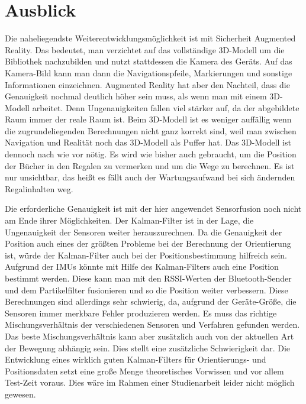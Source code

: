 \chapter{Ausblick}
  \label{Ausblick}
Die naheliegendste Weiterentwicklungsmöglichkeit ist mit Sicherheit Augmented Reality. Das bedeutet, man verzichtet auf das vollständige 3D-Modell um die Bibliothek nachzubilden und nutzt stattdessen die Kamera des Geräts. Auf das Kamera-Bild kann man dann die Navigationspfeile, Markierungen und sonstige Informationen einzeichnen. Augmented Reality hat aber den Nachteil, dass die Genauigkeit nochmal deutlich höher sein muss, als wenn man mit einem 3D-Modell arbeitet. Denn Ungenauigkeiten fallen viel stärker auf, da der abgebildete Raum immer der reale Raum ist. Beim 3D-Modell ist es weniger auffällig wenn die zugrundeliegenden Berechnungen nicht ganz korrekt sind, weil man zwischen Navigation und Realität noch das 3D-Modell als Puffer hat. Das 3D-Modell ist dennoch nach wie vor nötig. Es wird wie bisher auch gebraucht, um die Position der Bücher in den Regalen zu vermerken und um die Wege zu berechnen. Es ist nur unsichtbar, das heißt es fällt auch der Wartungsaufwand bei sich ändernden Regalinhalten weg.

Die erforderliche Genauigkeit ist mit der hier angewendet Sensorfusion noch nicht am Ende ihrer Möglichkeiten. Der Kalman-Filter ist in der Lage, die Ungenauigkeit der Sensoren weiter herauszurechnen. Da die Genauigkeit der Position auch eines der größten Probleme bei der Berechnung der Orientierung ist, würde der Kalman-Filter auch bei der Positionsbestimmung hilfreich sein. Aufgrund der IMUs könnte mit Hilfe des Kalman-Filters auch eine Position bestimmt werden. Diese kann man mit den RSSI-Werten der Bluetooth-Sender und dem Partikelfilter fusionieren und so die Position weiter verbessern. Diese Berechnungen sind allerdings sehr schwierig, da, aufgrund der Geräte-Größe, die Sensoren immer merkbare Fehler produzieren werden. Es muss das richtige Mischungsverhältnis der verschiedenen Sensoren und Verfahren gefunden werden. Das beste Mischungsverhältnis kann aber zusätzlich auch von der aktuellen Art der Bewegung abhängig sein. Dies stellt eine zusätzliche Schwierigkeit dar. Die Entwicklung eines wirklich guten Kalman-Filters für Orientierungs- und Positionsdaten setzt eine große Menge theoretisches Vorwissen und vor allem Test-Zeit voraus. Dies wäre im Rahmen einer Studienarbeit leider nicht möglich gewesen.

